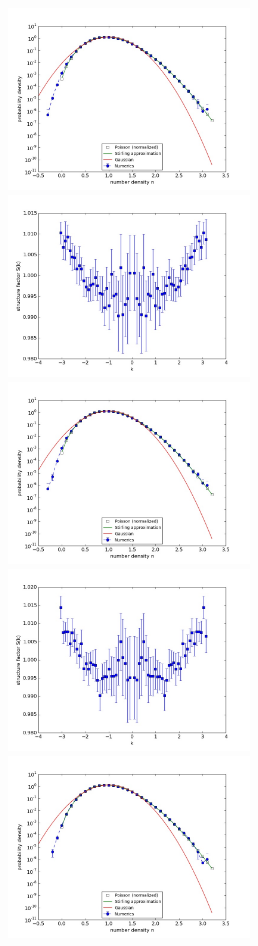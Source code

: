 \documentclass{article}
\begin{document}
\begin{figure}
\begin{center}
\end{center}
\includegraphics[width=0.5\linewidth,height=1.9in]{fig1/appendix_exp_react_dt0.1_hist_mid1.jpg}
\includegraphics[width=0.5\linewidth,height=1.9in]{fig1/appendix_exp_react_dt0.1_Sk_mid1.jpg}
\includegraphics[width=0.5\linewidth,height=1.9in]{fig1/appendix_exp_react_dt0.1_hist_mid2.jpg}
\includegraphics[width=0.5\linewidth,height=1.9in]{fig1/appendix_exp_react_dt0.1_Sk_mid2.jpg}
\includegraphics[width=0.5\linewidth,height=1.9in]{fig1/appendix_exp_react_dt0.1_hist_mid3.jpg}

\end{figure}
\end{document}
